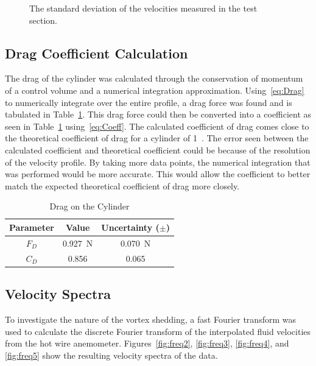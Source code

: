 \documentclass[journal,letterpaper]{IEEEtran}
\begin{document}
\begin{figure}[H]
    \centering
    
    \caption{The standard deviation of the velocities measured in the test section.}
    \label{fig:deviation}
\end{figure}

\subsection{Drag Coefficient Calculation}

The drag of the cylinder was calculated through the conservation of momentum of a control volume and a numerical integration approximation.
Using~\eqref{eq:Drag} to numerically integrate over the entire profile, a drag force was found and is tabulated in Table~\ref{tab:Drag}.
This drag force could then be converted into a coefficient as seen in Table~\ref{tab:Drag} using~\eqref{eq:Coeff}.
The calculated coefficient of drag comes close to the theoretical coefficient of drag for a cylinder of 1~\cite{dragRef}.
The error seen between the calculated coefficient and theoretical coefficient could be because of the resolution of the velocity profile.
By taking more data points, the numerical integration that was performed would be more accurate.
This would allow the coefficient to better match the expected theoretical coefficient of drag more closely.

\begin{table}[H]
    \centering
    \caption{Drag on the Cylinder}
    \begin{tabular}{ccc}
    \toprule
    Parameter & Value & Uncertainty ($\pm$) \\ \midrule \midrule
    $F_D$ & \qty{0.927}{\newton} & \qty{0.070}{\newton} \\
    $C_D$ & 0.856 & 0.065 \\ \bottomrule
    \end{tabular}
    \label{tab:Drag}
\end{table}

\subsection{Velocity Spectra}

To investigate the nature of the vortex shedding, a fast Fourier transform was used to calculate the discrete Fourier transform of the interpolated fluid velocities from the hot wire anemometer. Figures~\ref{fig:freq2}, \ref{fig:freq3}, \ref{fig:freq4}, and \ref{fig:freq5} show the resulting velocity spectra of the data.
\end{document}
